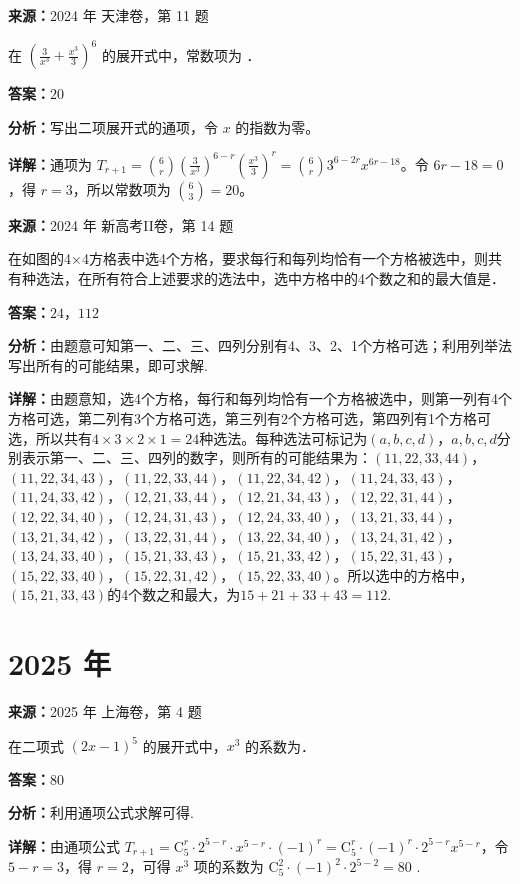 \begin{question}[points=5]
\textbf{来源：}2024 年 天津卷，第 11 题\par
在 $\left(\frac{3}{x^3}+\frac{x^3}{3}\right)^6$ 的展开式中，常数项为 ．
\fillin[{$20$}]
\begin{solution}
\textbf{答案：}$20$

\textbf{分析：}写出二项展开式的通项，令 $x$ 的指数为零。

\textbf{详解：}通项为 $T_{r+1}=\binom{6}{r}\left(\frac{3}{x^3}\right)^{6-r}\left(\frac{x^3}{3}\right)^r=\binom{6}{r}3^{6-2r}x^{6r-18}$。令 $6r-18=0$，得 $r=3$，所以常数项为 $\binom{6}{3}=20$。
\end{solution}
\end{question}

\begin{question}[points=5]
\textbf{来源：}2024 年 新高考II卷，第 14 题\par
在如图的4×4方格表中选4个方格，要求每行和每列均恰有一个方格被选中，则共有种选法，在所有符合上述要求的选法中，选中方格中的4个数之和的最大值是．
\fillin[{$24$，$112$}]
\begin{solution}
\textbf{答案：}$24$，$112$

\textbf{分析：}由题意可知第一、二、三、四列分别有4、3、2、1个方格可选；利用列举法写出所有的可能结果，即可求解.

\textbf{详解：}由题意知，选4个方格，每行和每列均恰有一个方格被选中，则第一列有4个方格可选，第二列有3个方格可选，第三列有2个方格可选，第四列有1个方格可选，所以共有$4\times3\times2\times1=24$种选法。每种选法可标记为$(a,b,c,d)$，$a,b,c,d$分别表示第一、二、三、四列的数字，则所有的可能结果为：$(11,22,33,44)$，$(11,22,34,43)$，$(11,22,33,44)$，$(11,22,34,42)$，$(11,24,33,43)$，$(11,24,33,42)$，$(12,21,33,44)$，$(12,21,34,43)$，$(12,22,31,44)$，$(12,22,34,40)$，$(12,24,31,43)$，$(12,24,33,40)$，$(13,21,33,44)$，$(13,21,34,42)$，$(13,22,31,44)$，$(13,22,34,40)$，$(13,24,31,42)$，$(13,24,33,40)$，$(15,21,33,43)$，$(15,21,33,42)$，$(15,22,31,43)$，$(15,22,33,40)$，$(15,22,31,42)$，$(15,22,33,40)$。所以选中的方格中，$(15,21,33,43)$的4个数之和最大，为$15+21+33+43=112$.
\end{solution}
\end{question}

\section*{2025 年}

\begin{question}[points=4]
\textbf{来源：}2025 年 上海卷，第 4 题\par
在二项式 $(2x-1)^5$ 的展开式中，$x^3$ 的系数为．
\fillin[{$80$}]
\begin{solution}
\textbf{答案：}$80$

\textbf{分析：}利用通项公式求解可得.

\textbf{详解：}由通项公式 $T_{r+1} = \mathrm{C}_5^r \cdot 2^{5-r} \cdot x^{5-r} \cdot (-1)^r = \mathrm{C}_5^r \cdot (-1)^r \cdot 2^{5-r} x^{5-r}$，令 $5-r=3$，得 $r=2$，可得 $x^3$ 项的系数为 $\mathrm{C}_5^2 \cdot (-1)^2 \cdot 2^{5-2} = 80$ .
\end{solution}
\end{question}

